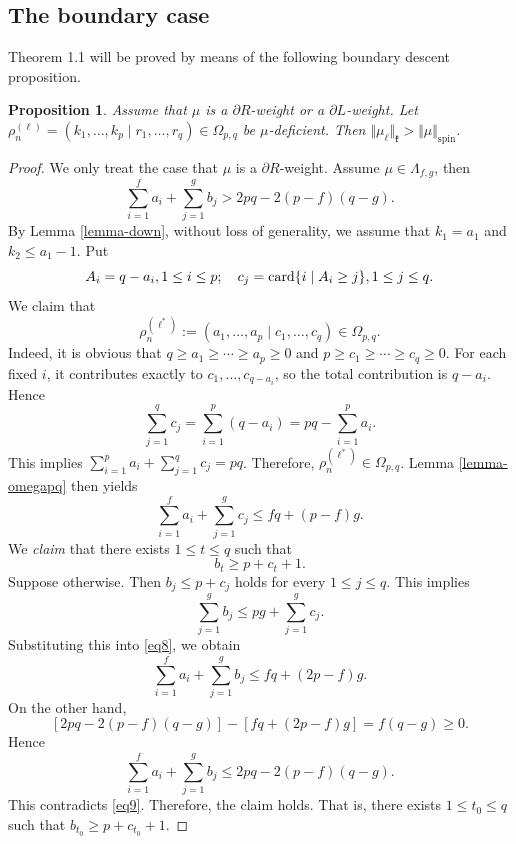 \documentclass[11pt]{amsart}
\theoremstyle{plain}
\newtheorem{prop}[thm]{Proposition}
\theoremstyle{definition}
\def\card{\mathop{\hbox {card}}\nolimits}
\newcommand{\frk}{\mathfrak{k}}
\begin{document}
\subsection{The boundary case}

Theorem 1.1 will be proved by means of the following boundary descent proposition.

\begin{prop}\label{prop-boundary}
	Assume that $\mu$ is a $\partial R$-weight or a $\partial L$-weight. Let $\rho_n^{(\ell)}=(k_1, \dots, k_p \mid r_1, \dots, r_q)\in \Omega_{p,q}$ be $\mu$-deficient. Then $\Vert\mu_\ell\Vert_\frk>\Vert\mu\Vert_{\mathrm{spin}}$.
\end{prop}
\begin{proof}
	We only treat the case that $\mu$ is a $\partial R$-weight. Assume $\mu \in \Lambda_{f,g}$, then
\begin{equation}\label{eq9}
\sum_{i=1}^f a_i+\sum_{j=1}^g b_j>2pq-2(p-f)(q-g).
\end{equation}
	By Lemma \ref{lemma-down}, without loss of generality, we assume that $k_1=a_1$ and $k_2\le a_1-1$. Put
	\[A_i=q-a_i, 1\leq i\leq p; \quad c_j=\card\{i\mid A_i\ge j\}, 1\leq j\leq q.\]
	We claim that
	\[\rho_n^{(\ell^*)}:=(a_1,\dots,a_p\mid c_1,\dots,c_q)\in\Omega_{p,q}.\]
	Indeed, it is obvious that $q\ge a_1\ge\cdots\ge a_p\ge 0$ and $p\ge c_1\ge\cdots\ge c_q\ge 0$. For each fixed $i$, it contributes exactly to $c_1,\dots,c_{q-a_i}$, so the total contribution is $q-a_i$. Hence
	\[\sum_{j=1}^qc_j=\sum_{i=1}^p(q-a_i)=pq-\sum_{i=1}^pa_i.\]
	This implies $\sum_{i=1}^pa_i+\sum_{j=1}^qc_j=pq$. Therefore, $\rho_n^{(\ell^*)}\in\Omega_{p,q}$. Lemma \ref{lemma-omegapq} then yields
	\begin{equation}\label{eq8}
	\sum_{i=1}^f a_i+\sum_{j=1}^g c_j\le fq+(p-f)g.
	\end{equation}
	We \emph{claim} that there exists $1\leq t\le q$ such that
	\[b_t\ge p+c_t+1.\]
	Suppose otherwise. Then $b_j\le p+c_j$ holds for every $1\le j\le q$. This implies
	\[\sum_{j=1}^g b_j\le pg+\sum_{j=1}^g c_j.\]
	Substituting this into \eqref{eq8}, we obtain
	\[\sum_{i=1}^f a_i+\sum_{j=1}^g b_j\le fq+(2p-f)g.\]
	On the other hand,
	\[[2pq-2(p-f)(q-g)]-[fq+(2p-f)g]=f(q-g)\ge 0.\]
	Hence
	\[\sum_{i=1}^f a_i+\sum_{j=1}^g b_j\le 2pq-2(p-f)(q-g).\]
	This contradicts \eqref{eq9}. Therefore, the claim holds. That is, there exists $1\leq t_0\le q$ such that $b_{t_0}\ge p+c_{t_0}+1$.
	

\end{proof}
\end{document}
